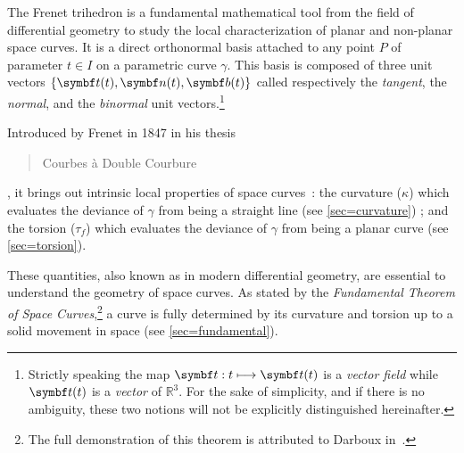 
The Frenet trihedron is a fundamental mathematical tool from the field of differential geometry to study the local characterization of planar and non-planar space curves. It is a direct orthonormal basis attached to any point $P$ of parameter $t \in I$ on a parametric curve $\gamma$. This basis is composed of three unit vectors $\{\vect{t}(t),\vect{n}(t),\vect{b}(t)\}$ called respectively the \emph{tangent}, the \emph{normal}, and the \emph{binormal} unit vectors.\footnote{
Strictly speaking the map $\fonction{\vect{t}}{t}{\vect{t}(t)}$ is a \emph{vector field} while $\vect{t}(t)$ is a \emph{vector} of $\mathbb{R}^3$. For the sake of simplicity, and if there is no ambiguity, these two notions will not be explicitly distinguished hereinafter.}

Introduced by Frenet in 1847 in his thesis \blockcquote[]{Frenet1852}{Courbes à Double Courbure}, it brings out intrinsic local properties of space curves~: the curvature ($\kappa$) which evaluates the deviance of $\gamma$ from being a straight line (see \cref{sec=curvature}) ; and the torsion ($\tau_f$) which evaluates the deviance of $\gamma$ from being a planar curve (see \cref{sec=torsion}).

These quantities, also known as  in modern differential geometry, are essential to understand the geometry of space curves. As stated by the \emph{Fundamental Theorem of Space Curves},\footnote{The full demonstration of this theorem is attributed to Darboux in~\cite[p.11]{Delcourt2007}.} a curve is fully determined by its curvature and torsion up to a solid movement in space (see \cref{sec=fundamental}).

